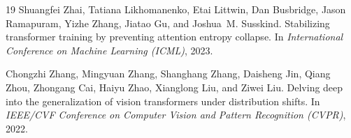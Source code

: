 \documentclass{article}
\begin{document}
\begin{thebibliography}{19}
Shuangfei Zhai, Tatiana Likhomanenko, Etai Littwin, Dan Busbridge, Jason Ramapuram, Yizhe Zhang, Jiatao Gu, and Joshua~M. Susskind.
\newblock Stabilizing transformer training by preventing attention entropy collapse.
\newblock In \emph{International Conference on Machine Learning (ICML)}, 2023.

Chongzhi Zhang, Mingyuan Zhang, Shanghang Zhang, Daisheng Jin, Qiang Zhou, Zhongang Cai, Haiyu Zhao, Xianglong Liu, and Ziwei Liu.
\newblock Delving deep into the generalization of vision transformers under distribution shifts.
\newblock In \emph{IEEE/CVF Conference on Computer Vision and Pattern Recognition (CVPR)}, 2022.

\end{thebibliography}
\end{document}
